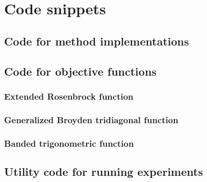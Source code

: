 \appendix

\section{Code snippets}


\subsection{Code for method implementations}

\subsection{Code for objective functions}

\subsubsection{Extended Rosenbrock function}

\subsubsection{Generalized Broyden tridiagonal function}

\subsubsection{Banded trigonometric function}

\subsection{Utility code for running experiments}